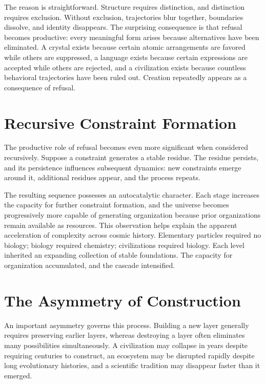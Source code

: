 \documentclass[11pt,oneside]{book}
\theoremstyle{plain}
\theoremstyle{definition}
\theoremstyle{remark}
\begin{document}
The reason is straightforward. Structure requires distinction, and distinction requires exclusion. Without exclusion, trajectories blur together, boundaries dissolve, and identity disappears. The surprising consequence is that refusal becomes productive: every meaningful form arises because alternatives have been eliminated. A crystal exists because certain atomic arrangements are favored while others are suppressed, a language exists because certain expressions are accepted while others are rejected, and a civilization exists because countless behavioral trajectories have been ruled out. Creation repeatedly appears as a consequence of refusal.

\section{Recursive Constraint Formation}

The productive role of refusal becomes even more significant when considered recursively. Suppose a constraint generates a stable residue. The residue persists, and its persistence influences subsequent dynamics: new constraints emerge around it, additional residues appear, and the process repeats.

The resulting sequence possesses an autocatalytic character. Each stage increases the capacity for further constraint formation, and the universe becomes progressively more capable of generating organization because prior organizations remain available as resources. This observation helps explain the apparent acceleration of complexity across cosmic history. Elementary particles required no biology; biology required chemistry; civilizations required biology. Each level inherited an expanding collection of stable foundations. The capacity for organization accumulated, and the cascade intensified.

\section{The Asymmetry of Construction}

An important asymmetry governs this process. Building a new layer generally requires preserving earlier layers, whereas destroying a layer often eliminates many possibilities simultaneously. A civilization may collapse in years despite requiring centuries to construct, an ecosystem may be disrupted rapidly despite long evolutionary histories, and a scientific tradition may disappear faster than it emerged.
\end{document}

